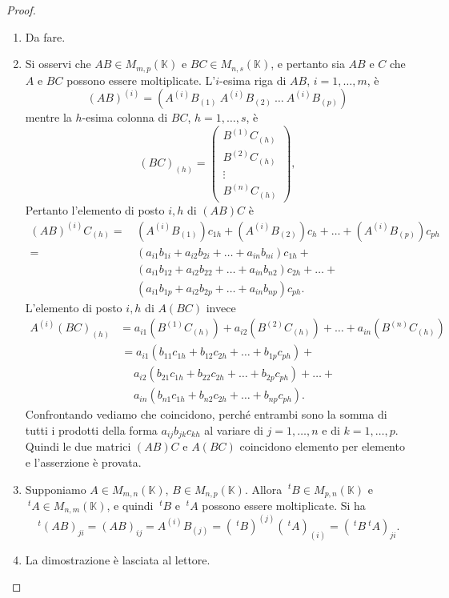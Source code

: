 \documentclass{article}
\theoremstyle{plain}
\theoremstyle{definition}
\theoremstyle{remark}
\begin{document}
\begin{proof}\hfill
    \begin{enumerate}
        \item Da fare.
        \item Si osservi che \( AB \in M_{m,p}(\mathbb{K}) \) e \( BC \in M_{n,s}(\mathbb{K}) \), e pertanto sia \( AB \) e \( C \) che \( A \) e \( BC \) possono essere moltiplicate. 
        L'\( i \)-esima riga di \( AB \), \( i = 1, \ldots, m \), è
        \[
        (AB)^{(i)} = (A^{(i)}B_{(1)} \ A^{(i)}B_{(2)} \ \ldots \ A^{(i)}B_{(p)})
        \]
        mentre la \( h \)-esima colonna di \( BC \), \( h = 1, \ldots, s \), è
        \[ (BC)_{(h)}=
        \begin{pmatrix}
        B^{(1)} C_{(h)} \\
        B^{(2)} C_{(h)} \\
        \vdots \\
        B^{(n)} C_{(h)}
        \end{pmatrix},
        \]
        Pertanto l'elemento di posto \( i, h \) di \( (AB)C \) è
        \begin{align*}
            (AB)^{(i)}C_{(h)}=\,&(A^{(i)}B_{(1)})c_{1h}+(A^{(i)}B_{(2)})c_{h}+\ldots+(A^{(i)}B_{(p)})c_{ph}\\
            =\,& (a_{i1}b_{1i}+a_{i2}b_{2i}+\ldots+a_{in}b_{ni})c_{1h} + \\
            & (a_{i1}b_{12}+a_{i2}b_{22} +\ldots+a_{in}b_{n2})c_{2h} + \ldots + \\
            & (a_{i1}b_{1p}+a_{i2}b_{2p}+\ldots+a_{in}b_{np})c_{ph}.
        \end{align*}
        L'elemento di posto \( i, h \) di \( A(BC) \) invece
        \begin{align*}
            A^{(i)}(BC)_{(h)} &= a_{i1}(B^{(1)} C_{(h)}) + a_{i2}(B^{(2)} C_{(h)}) + \ldots + a_{in}(B^{(n)} C_{(h)})\\
            &\,= a_{i1}(b_{11} c_{1h} + b_{12} c_{2h} + \ldots + b_{1p} c_{ph}) +\\
            &\;\quad a_{i2}(b_{21} c_{1h} + b_{22} c_{2h} + \ldots + b_{2p} c_{ph}) + \ldots +\\
            &\;\quad a_{in}(b_{n1} c_{1h} + b_{n2} c_{2h} + \ldots + b_{np} c_{ph}).
        \end{align*}
        Confrontando vediamo che coincidono, perché entrambi sono la somma di tutti i prodotti della forma 
        \( a_{ij} b_{jk} c_{kh} \) al variare di \( j = 1, \ldots, n \) e di \( k = 1, \ldots, p \). 
        Quindi le due matrici \( (AB) C \) e \( A(BC) \) coincidono elemento per elemento e l'asserzione è provata.
        \item Supponiamo \( A \in M_{m,n}(\mathbb{K}) \), \( B \in M_{n,p}(\mathbb{K}) \). 
        Allora \( \ ^{t}B\in M_{p,n}(\mathbb{K}) \) e \( \ ^{t}A\in M_{n,m}(\mathbb{K}) \), e quindi \( \ ^{t}B \) e \( \ ^{t}A \) possono essere moltiplicate. 
        Si ha
        \[
            \ ^{t}(AB)_{ji} = (AB)_{ij} = A^{(i)} B_{(j)} = (\ ^{t}B)^{(j)}(\ ^{t}A)_{(i)} = (\ ^{t}B \ ^{t}A)_{ji}.
        \]
        \item La dimostrazione è lasciata al lettore.
    \end{enumerate}
\end{proof}
\end{document}
